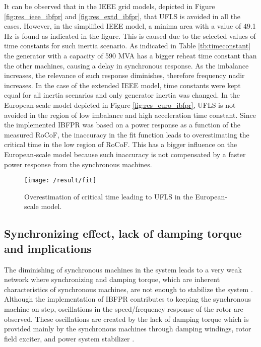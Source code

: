 It can be observed that in the IEEE grid models, depicted in Figure \ref{fig:res_ieee_ibfpr} and \ref{fig:res_extd_ibfpr}, that UFLS is avoided in all the cases. However, in the simplified IEEE model, a minima area with a value of 49.1 Hz is found as indicated in the figure. This is caused due to the selected values of time constants for such inertia scenario. As indicated in Table \ref{tb:timeconstant} the generator with a capacity of 590 MVA has a bigger reheat time constant than the other machines, causing a delay in synchronous response. As the imbalance increases, the relevance of such response diminishes, therefore frequency nadir increases. In the case of the extended IEEE model, time constants were kept equal for all inertia scenarios and only generator inertia was changed. In the European-scale model depicted in Figure \ref{fig:res_euro_ibfpr}, UFLS is not avoided in the region of low imbalance and high acceleration time constant. Since the implemented IBFPR was based on a power response as a function of the measured RoCoF, the inaccuracy in the fit function leads to overestimating the critical time in the low region of RoCoF. This has a bigger influence on the European-scale model because such inaccuracy is not compensated by a faster power response from the synchronous machines.

\begin{figure}[h]
	\centering
	\texttt{[image: /result/fit]}
	\caption{Overestimation of critical time leading to UFLS in the European-scale model.}
	\label{fig:res_fit}
\end{figure}

\subsection{Synchronizing effect, lack of damping torque and implications}

The diminishing of synchronous machines in the system leads to a very weak network where synchronizing and damping torque, which are inherent characteristics of synchronous machines, are not enough to stabilize the system \cite{kundur1994power}. Although the implementation of IBFPR contributes to keeping the synchronous machine on step, oscillations in the speed/frequency response of the rotor are observed. These oscillations are created by the lack of damping torque which is provided mainly by the synchronous machines through damping windings, rotor field exciter, and power system stabilizer \cite{kundur1994power}. 

